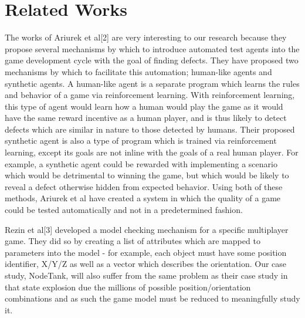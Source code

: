 \documentclass[conference]{IEEEtran}
\begin{document}
\section{Related Works}

The works of Ariurek et al[2] are very interesting to our research because they propose several mechanisms by which to introduce automated test agents into the game
development cycle with the goal of finding defects. They have proposed two mechanisms by which to facilitate this automation; human-like agents and synthetic agents. 
A human-like agent is a separate program which learns the rules and behavior of a game via reinforcement learning. With reinforcement learning, this type of agent would 
learn how a human would play the game as it would have the same reward incentive as a human player, and is thus likely to detect defects which are similar in nature to those 
detected by humans. Their proposed synthetic agent is also a type of program which is trained via reinforcement learning, except its goals are not inline with the goals of a 
real human player. For example, a synthetic agent could be rewarded with implementing a scenario which would be detrimental to winning the game, but which would be likely to
reveal a defect otherwise hidden from expected behavior. Using both of these methods, Ariurek et al have created a system in which the quality of a game could be tested automatically 
and not in a predetermined fashion. 

Rezin et al[3] developed a model checking mechanism for a specific multiplayer game. They did so by creating a list of attributes which are mapped to parameters into the model -
 for example, each object must have some position identifier, X/Y/Z as well as a vector which describes the orientation. Our case study, NodeTank, will also suffer from the same 
 problem as their case study in that state explosion due the millions of possible position/orientation combinations and as such the game model must be reduced to meaningfully study it. 
\end{document}
